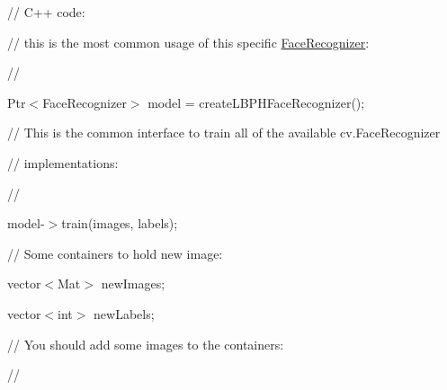 {\ttfamily }

{\ttfamily }

{\ttfamily // C++ code\+:}

{\ttfamily }

{\ttfamily }

{\ttfamily // this is the most common usage of this specific \mbox{\hyperlink{classorg_1_1opencv_1_1contrib_1_1_face_recognizer}{Face\+Recognizer}}\+:}

{\ttfamily }

{\ttfamily }

{\ttfamily //}

{\ttfamily }

{\ttfamily }

{\ttfamily Ptr$<$\+Face\+Recognizer$>$ model = create\+L\+B\+P\+H\+Face\+Recognizer();}

{\ttfamily }

{\ttfamily }

{\ttfamily // This is the common interface to train all of the available cv.\+Face\+Recognizer}

{\ttfamily }

{\ttfamily }

{\ttfamily // implementations\+:}

{\ttfamily }

{\ttfamily }

{\ttfamily //}

{\ttfamily }

{\ttfamily }

{\ttfamily model-\/$>$train(images, labels);}

{\ttfamily }

{\ttfamily }

{\ttfamily // Some containers to hold new image\+:}

{\ttfamily }

{\ttfamily }

{\ttfamily vector$<$\+Mat$>$ new\+Images;}

{\ttfamily }

{\ttfamily }

{\ttfamily vector$<$int$>$ new\+Labels;}

{\ttfamily }

{\ttfamily }

{\ttfamily // You should add some images to the containers\+:}

{\ttfamily }

{\ttfamily }

{\ttfamily //}


